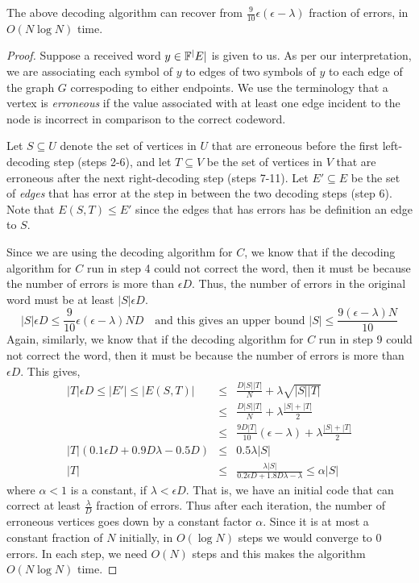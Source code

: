 \begin{lemma}
The above decoding algorithm can recover from $\frac{9}{10}\epsilon(\epsilon-\lambda)$ fraction of errors, in $O(N \log N)$ time.
\end{lemma}
\begin{proof}
Suppose a received word $y \in {\mathbb{F}}^|E|$ is given to us. As per our interpretation, we are associating each symbol of $y$ to edges of two symbols of $y$ to each edge of the graph $G$ correspoding to either endpoints. We use the terminology that a vertex is \textit{erroneous} if the value associated with at least one edge incident to the node is incorrect in comparison to the correct codeword.

Let $S \subseteq U$ denote the set of vertices in $U$ that are erroneous before the first left-decoding step (steps 2-6), and let $T \subseteq V$ be the set of vertices in $V$ that are erroneous after the next right-decoding step (steps 7-11). Let $E' \subseteq E$ be the set of \textit{edges} that has error at the step in between the two decoding steps (step 6). Note that $E(S,T) \le E'$ since the edges that has errors has be definition an edge to $S$.

Since we are using the decoding algorithm for $C$, we know that if the decoding algorithm for $C$ run in step 4 could not correct the word, then it must be because the number of errors is more than $\epsilon D$. Thus, the number of errors in the original word must be at least $|S|\epsilon D$. 
$$
|S|\epsilon D \le \frac{9}{10} \epsilon (\epsilon - \lambda) ND
\textrm{ ~~and this gives an upper bound }
|S| \le \frac{9(\epsilon-\lambda)N}{10}
$$
Again, similarly, we know that if the decoding algorithm for $C$ run in step 9 could not correct the word, then it must be because the number of errors is more than $\epsilon D$.
This gives,
\begin{eqnarray*}
|T|\epsilon D \le |E'| \le |E(S,T)| & \le & \frac{D|S||T|}{N}+\lambda \sqrt{|S||T|} \\
& \le & \frac{D|S||T|}{N}+\lambda \frac{|S|+|T|}{2} \\
& \le & \frac{9D|T|}{10}(\epsilon-\lambda)+\lambda \frac{|S|+|T|}{2}\\
|T|\left( 0.1 \epsilon D  + 0.9 D \lambda - 0.5D \right) & \le & 0.5\lambda |S|\\
|T| & \le & \frac{\lambda|S|}{0.2 \epsilon D  + 1.8 D \lambda - \lambda } \le \alpha|S|
\end{eqnarray*}
where $\alpha < 1$ is a constant, if $\lambda < \epsilon D$. That is, we have an initial code that can correct at least $\frac{\lambda}{D}$ fraction of errors. Thus after each iteration, the number of erroneous vertices goes down by a constant factor $\alpha$. Since it is at most a constant fraction of $N$ initially, in $O(\log N)$ steps we would converge to $0$ errors. In each step, we need $O(N)$ steps and this makes the algorithm $O(N \log N)$ time.
\end{proof}
